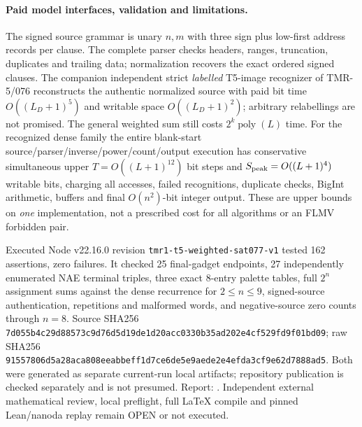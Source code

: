 \documentclass[11pt]{article}
\begin{document}
\paragraph{Paid model interfaces, validation and limitations.}
The signed source grammar is unary $n,m$ with three sign plus
low-first address records per clause. The complete parser checks
headers, ranges, truncation, duplicates and trailing data;
normalization recovers the exact ordered signed clauses.
The companion independent strict \emph{labelled} T5-image
recognizer of TMR-5/076 reconstructs the authentic normalized
source with paid bit time $O((L_D+1)^5)$ and writable space
$O((L_D+1)^2)$; arbitrary relabellings are not promised.
The general weighted sum still costs $2^k\operatorname{poly}(L)$
time. For the recognized dense family the entire blank-start
source/parser/inverse/power/count/output execution has
conservative simultaneous upper
$T=O((L+1)^{12})$ bit steps and
$S_{\rm peak}=O((L+1)^4)$ writable bits, charging all accesses,
failed recognitions, duplicate checks, BigInt arithmetic,
buffers and final $O(n^2)$-bit integer output.
These are upper bounds on \emph{one} implementation, not
a prescribed cost for all algorithms or an FLMV forbidden pair.

Executed Node v22.16.0 revision
\texttt{tmr1-t5-weighted-sat077-v1} tested 162 assertions,
zero failures. It checked 25 final-gadget endpoints, 27
independently enumerated NAE terminal triples, three exact
8-entry palette tables, full $2^n$ assignment sums against
the dense recurrence for $2\le n\le9$, signed-source
authentication, repetitions and malformed words, and
negative-source zero counts through $n=8$. Source SHA256
\texttt{7d055b4c29d88573c9d76d5d19de1d20acc0330b35ad202e4cf529fd9f01bd09};
raw SHA256
\texttt{91557806d5a28aca808eeabbeff1d7ce6de5e9aede2e4efda3cf9e62d7888ad5}.
Both were generated as separate current-run local artifacts;
repository publication is checked separately and is not presumed.
Report:
.
Independent external mathematical review, local preflight,
full \LaTeX{} compile and pinned Lean/nanoda replay remain OPEN
or not executed.
\end{document}
